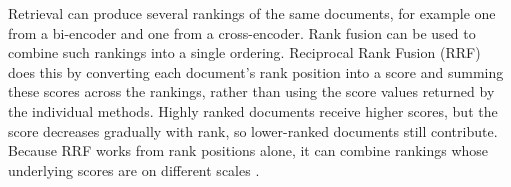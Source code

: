 Retrieval can produce several rankings of the same documents, for example 
one from a bi-encoder and one from a cross-encoder. Rank fusion can be used 
to combine such rankings into a single ordering. Reciprocal Rank Fusion (RRF) does this 
by converting each document's rank position into a score and summing these 
scores across the rankings, rather than using the score values returned by 
the individual methods. Highly ranked documents receive higher scores, but 
the score decreases gradually with rank, so lower-ranked documents still 
contribute. Because RRF works from rank positions alone, it can combine 
rankings whose underlying scores are on different scales 
\parencite{cormack2009reciprocal_rank_fusion}.
